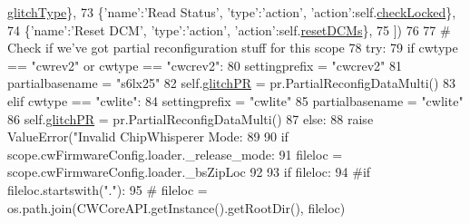 \begin{DoxyCode}
      \hyperlink{classsoftware_1_1chipwhisperer_1_1capture_1_1scopes_1_1cwhardware_1_1ChipWhispererGlitch_1_1ChipWhispererGlitch_aee93f9bc9042093f7ad881a9b46375cd}{glitchType}\},
73             \{\textcolor{stringliteral}{'name'}:\textcolor{stringliteral}{'Read Status'}, \textcolor{stringliteral}{'type'}:\textcolor{stringliteral}{'action'}, \textcolor{stringliteral}{'action'}:self.\hyperlink{classsoftware_1_1chipwhisperer_1_1capture_1_1scopes_1_1cwhardware_1_1ChipWhispererGlitch_1_1ChipWhispererGlitch_a02cb903ae6f0fc4aa79021b451dd9118}{checkLocked}\},
74             \{\textcolor{stringliteral}{'name'}:\textcolor{stringliteral}{'Reset DCM'}, \textcolor{stringliteral}{'type'}:\textcolor{stringliteral}{'action'}, \textcolor{stringliteral}{'action'}:self.\hyperlink{classsoftware_1_1chipwhisperer_1_1capture_1_1scopes_1_1cwhardware_1_1ChipWhispererGlitch_1_1ChipWhispererGlitch_ab099f869f5a55e0adc66c9372c47c1ef}{resetDCMs}\},
75         ])
76 
77         \textcolor{comment}{# Check if we've got partial reconfiguration stuff for this scope}
78         \textcolor{keywordflow}{try}:
79             \textcolor{keywordflow}{if} cwtype == \textcolor{stringliteral}{"cwrev2"} \textcolor{keywordflow}{or} cwtype == \textcolor{stringliteral}{"cwcrev2"}:
80                 settingprefix = \textcolor{stringliteral}{"cwcrev2"}
81                 partialbasename = \textcolor{stringliteral}{"s6lx25"}
82                 self.\hyperlink{classsoftware_1_1chipwhisperer_1_1capture_1_1scopes_1_1cwhardware_1_1ChipWhispererGlitch_1_1ChipWhispererGlitch_a4eb93174ebf6845b1be3d4378afb212b}{glitchPR} = pr.PartialReconfigDataMulti()
83             \textcolor{keywordflow}{elif} cwtype == \textcolor{stringliteral}{"cwlite"}:
84                 settingprefix = \textcolor{stringliteral}{"cwlite"}
85                 partialbasename = \textcolor{stringliteral}{"cwlite"}
86                 self.\hyperlink{classsoftware_1_1chipwhisperer_1_1capture_1_1scopes_1_1cwhardware_1_1ChipWhispererGlitch_1_1ChipWhispererGlitch_a4eb93174ebf6845b1be3d4378afb212b}{glitchPR} = pr.PartialReconfigDataMulti()
87             \textcolor{keywordflow}{else}:
88                 \textcolor{keywordflow}{raise} ValueError(\textcolor{stringliteral}{"Invalid ChipWhisperer Mode: %
89 
90             \textcolor{keywordflow}{if} scope.cwFirmwareConfig.loader.\_release\_mode:
91                 fileloc = scope.cwFirmwareConfig.loader.\_bsZipLoc
92 
93                 \textcolor{keywordflow}{if} fileloc:
94                     \textcolor{comment}{#if fileloc.startswith("."):}
95                     \textcolor{comment}{#    fileloc = os.path.join(CWCoreAPI.getInstance().getRootDir(), fileloc)}
}
\end{DoxyCode}
